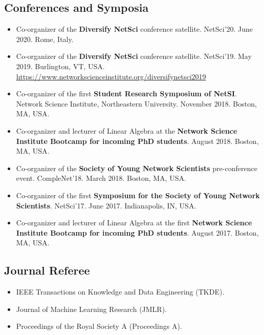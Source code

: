 \documentclass[12pt,]{scrartcl}
\begin{document}
\subsection{Conferences and Symposia}\label{conferences}

\begin{itemize}
\leftskip-0.25in

\item Co-organizer of the \textbf{Diversify NetSci} conference satellite. NetSci'20. June 2020. Rome, Italy.

\item Co-organizer of the \textbf{Diversify NetSci} conference satellite. NetSci'19. May 2019. Burlington, VT, USA. \url{https://www.networkscienceinstitute.org/diversifynetsci2019}

\item Co-organizer of the first \textbf{Student Research Symposium of NetSI}. Network Science Institute, Northeastern University. November 2018. Boston, MA, USA. 

\item Co-organizer and lecturer of Linear Algebra at the \textbf{Network Science Institute Bootcamp for incoming PhD students}. August 2018. Boston, MA, USA.

\item Co-organizer of the \textbf{Society of Young Network Scientists} pre-conference event. CompleNet'18. March 2018. Boston, MA, USA.

\item Co-organizer of the first \textbf{Symposium for the Society of Young Network Scientists}. NetSci'17. June 2017. Indianapolis, IN, USA.

\item Co-organizer and lecturer of Linear Algebra at the first \textbf{Network Science Institute Bootcamp for incoming PhD students}. August 2017. Boston, MA, USA.

\end{itemize}


\subsection{Journal Referee}\label{journal-referee}

\begin{itemize}
\leftskip-0.25in

\item IEEE Transactions on Knowledge and Data Engineering (TKDE).

\item Journal of Machine Learning Research (JMLR).

\item Proceedings of the Royal Society A (Proceedings A).

\end{itemize}
\end{document}

